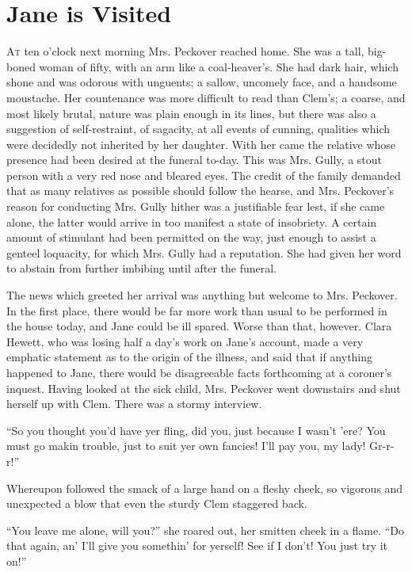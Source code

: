 \chapter {Jane is Visited}

\textsc{At} ten o'clock next morning Mrs. Peckover reached home. She was
a tall, big-boned woman of fifty, with an arm like a coal-heaver's. She
had dark hair, which shone and was odorous with unguents; a sallow,
uncomely face, and a handsome moustache. Her countenance was more
difficult to read than Clem's; a coarse, and most likely brutal, nature
was plain enough in its lines, but there was also a suggestion of
self-restraint, of sagacity, at all events of cunning, qualities which
were decidedly not inherited by her daughter. With her came the relative
whose presence had been desired at the funeral to-day. This was Mrs.
Gully, a stout person with a very red nose and bleared eyes. The
{}credit of the family demanded that as many relatives as possible
should follow the hearse, and Mrs. Peckover's reason for conducting Mrs.
Gully hither was a justifiable fear lest, if she came alone, the latter
would arrive in too manifest a state of insobriety. A certain amount of
stimulant had been permitted on the way, just enough to assist a genteel
loquacity, for which Mrs. Gully had a reputation. She had given her word
to abstain from further imbibing until after the funeral.

The news which greeted her arrival was anything but welcome to Mrs.
Peckover. In the first place, there would be far more work than usual to
be performed in the house today, and Jane could be ill spared. Worse
than that, however. Clara Hewett, who was losing half a day's work on
Jane's account, made a very emphatic statement as to the origin of the
illness, and said that if anything happened to Jane, there would be
disagreeable facts forthcoming at a coroner's inquest. Having looked at
the sick child, Mrs. Peckover went downstairs and shut {}herself up with
Clem. There was a stormy interview.

``So you thought you'd have yer fling, did you, just because I wasn't
'ere? You must go makin trouble, just to suit yer own fancies! I'll pay
you, my lady! Gr-r-r!''

Whereupon followed the smack of a large hand on a fleshy cheek, so
vigorous and unexpected a blow that even the sturdy Clem staggered back.

``You leave me alone, will you?'' she roared out, her smitten cheek in a
flame. ``Do that again, an' I'll give you somethin' for yerself! See if
I don't! You just try it on!''

